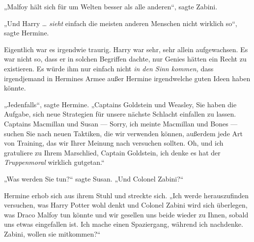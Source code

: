 „Malfoy hält sich für um Welten besser als alle anderen“, sagte Zabini.

„Und Harry … \emph{sieht} einfach die meisten anderen Menschen nicht wirklich so“, sagte Hermine.

Eigentlich war es irgendwie traurig. Harry war sehr, sehr allein aufgewachsen. Es war nicht so, dass er in solchen Begriffen dachte, nur Genies hätten ein Recht zu existieren. Es würde ihm nur einfach nicht \emph{in den Sinn kommen,} dass irgendjemand in Hermines Armee außer Hermine irgendwelche guten Ideen haben könnte.

„Jedenfalls“, sagte Hermine.
„Captains Goldstein und Weasley, Sie haben die Aufgabe, sich neue Strategien für unsere nächste Schlacht einfallen zu lassen. Captains Macmillan und Susan — Sorry, ich meinte Macmillan und Bones — suchen Sie nach neuen Taktiken, die wir verwenden können, außerdem jede Art von Training, das wir Ihrer Meinung nach versuchen sollten. Oh, und ich gratuliere zu Ihrem Marschlied, Captain Goldstein, ich denke es hat der \emph{Truppenmoral} wirklich gutgetan.“

„Was werden Sie tun?“ sagte Susan.
„Und Colonel Zabini?“

Hermine erhob sich aus ihrem Stuhl und streckte sich.
„Ich werde herauszufinden versuchen, was Harry Potter wohl denkt und Colonel Zabini wird sich überlegen, was Draco Malfoy tun könnte und wir gesellen uns beide wieder zu Ihnen, sobald uns etwas eingefallen ist. Ich mache einen Spaziergang, während ich nachdenke. Zabini, wollen sie mitkommen?“

